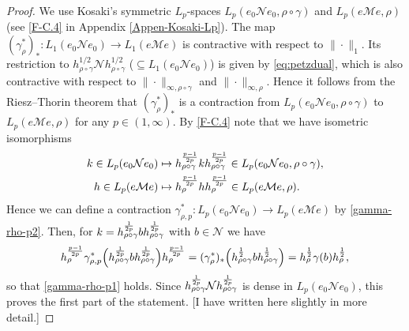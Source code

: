\documentclass[12pt]{article}
\theoremstyle{definition}
\theoremstyle{remark}
\numberwithin{equation}{section}
\def\Me{\mathcal M}
\def\Ne{\mathcal N}
\begin{document}
\begin{proof}
{\color{red}
We use Kosaki's symmetric $L_p$-spaces $L_p(e_0\Ne e_0,\rho\circ\gamma)$ and
$L_p(e\Me e,\rho)$ (see \eqref{F-C.4} in Appendix \ref{Appen-Kosaki-Lp}). The map
$(\gamma_\rho^*)_*:L_1(e_0\Ne e_0)\to L_1(e\Me e)$ is contractive
with respect to $\|\cdot\|_1$. Its restriction to $h_{\rho\circ\gamma}^{1/2}\Ne h_{\rho\circ\gamma}^{1/2}$
($\subseteq L_1(e_0\Ne e_0)$) is given by \eqref{eq:petzdual}, which is also contractive with respect
to $\|\cdot\|_{\infty,\rho\circ\gamma}$ and $\|\cdot\|_{\infty,\rho}$. Hence it follows from the Riesz--Thorin
theorem that $(\gamma_\rho^*)_*$ is a contraction from $L_p(e_0\Ne e_0,\rho\circ\gamma)$ to
$L_p(e\Me e,\rho)$ for any $p\in(1,\infty)$. By \eqref{F-C.4} note that we have isometric isomorphisms
\begin{align*}
k\in L_p(e_0\Ne e_0)&\mapsto h_{\rho\circ\gamma}^{p-1\over2p}kh_{\rho\circ\gamma}^{p-1\over2p}
\in L_p(e_0\Ne e_0,\rho\circ\gamma), \\
h\in L_p(e\Me e)&\mapsto h_\rho^{p-1\over2p}hh_\rho^{p-1\over2p}\in L_p(e\Me e,\rho).
\end{align*}
Hence we can define a contraction $\gamma_{\rho,p}^*:L_p(e_0\Ne e_0)\to L_p(e\Me e)$ by
\eqref{gamma-rho-p2}. Then, for $k=h_{\rho\circ\gamma}^{1\over2p}bh_{\rho\circ\gamma}^{1\over2p}$
with $b\in\Ne$ we have
\[
h_\rho^{p-1\over2p}\gamma_{\rho,p}^*\Bigl(h_{\rho\circ\gamma}^{1\over2p}b
h_{\rho\circ\gamma}^{1\over2p}\Bigr)h_\rho^{p-1\over2p}
=(\gamma_\rho^*)_*\Bigl(h_{\rho\circ\gamma}^{1\over2}bh_{\rho\circ\gamma}^{1\over2}\Bigr)
=h_\rho^{1\over2}\gamma(b)h_\rho^{1\over2},
\]
so that \eqref{gamma-rho-p1} holds.
Since $h_{\rho\circ\gamma}^{1\over 2p}\Ne h^{1\over
2p}_{\rho\circ\gamma}$ is dense in $L_p(e_0 \Ne e_0)$, this proves the first part of the statement.
[I have written here slightly in more detail.]}


\end{proof}
\end{document}
